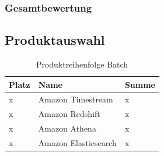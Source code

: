 \subsubsection{Gesamtbewertung}

\subsection{Produktauswahl}
\begin{table}[H]
\centering
\begin{tabular}{|l|l|l|}
\hline
Platz & Name & Summe \\ \hline
x & Amazon Timestream & \cellcolor[HTML]{DAE8FC}x \\ \hline
x & Amazon Redshift & \cellcolor[HTML]{DAE8FC}x \\ \hline
x & Amazon Athena & \cellcolor[HTML]{DAE8FC}x \\ \hline
x & Amazon Elasticsearch & \cellcolor[HTML]{DAE8FC}x \\ \hline
\end{tabular}
\caption{Produktreihenfolge Batch}
\label{tab:Reihenfolge-Batch}
\end{table}





